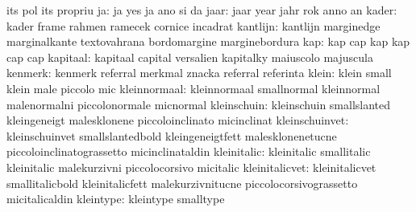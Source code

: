                            its                       pol
                           its                       propriu %
                       ja: ja                        yes
                           ja                        ano
                           si                        da
                     jaar: jaar                      year
                           jahr                      rok
                           anno                      an
                    kader: kader                     frame
                           rahmen                    ramecek
                           cornice                   incadrat
                 kantlijn: kantlijn                  marginedge
                           marginalkante             textovahrana
                           bordomargine              marginebordura
                      kap: kap                       cap
                           kap                       kap
                           cap                       cap
                 kapitaal: kapitaal                  capital
                           versalien                 kapitalky
                           maiuscolo                 majuscula
                  kenmerk: kenmerk                   referral
                           merkmal                   znacka
                           referral                  referinta
                    klein: klein                     small
                           klein                     male
                           piccolo                   mic
             kleinnormaal: kleinnormaal              smallnormal
                           kleinnormal               malenormalni
                           piccolonormale            micnormal
              kleinschuin: kleinschuin               smallslanted
                           kleingeneigt              malesklonene
                           piccoloinclinato          micinclinat
           kleinschuinvet: kleinschuinvet            smallslantedbold
                           kleingeneigtfett          malesklonenetucne
                           piccoloinclinatograssetto micinclinataldin
              kleinitalic: kleinitalic               smallitalic
                           kleinitalic               malekurzivni
                           piccolocorsivo            micitalic
           kleinitalicvet: kleinitalicvet            smallitalicbold
                           kleinitalicfett           malekurzivnitucne
                           piccolocorsivograssetto   micitalicaldin
                kleintype: kleintype                 smalltype
